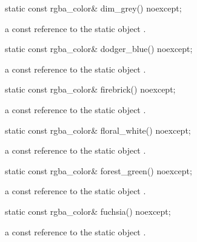 \begin{itemdecl}
static const rgba_color& dim_grey() noexcept;
\end{itemdecl}
\begin{itemdescr}
\pnum
\returns
a const reference to the static  object .
\end{itemdescr}

\begin{itemdecl}
static const rgba_color& dodger_blue() noexcept;
\end{itemdecl}
\begin{itemdescr}
\pnum
\returns
a const reference to the static  object .
\end{itemdescr}

\begin{itemdecl}
static const rgba_color& firebrick() noexcept;
\end{itemdecl}
\begin{itemdescr}
\pnum
\returns
a const reference to the static  object .
\end{itemdescr}

\begin{itemdecl}
static const rgba_color& floral_white() noexcept;
\end{itemdecl}
\begin{itemdescr}
\pnum
\returns
a const reference to the static  object .
\end{itemdescr}

\begin{itemdecl}
static const rgba_color& forest_green() noexcept;
\end{itemdecl}
\begin{itemdescr}
\pnum
\returns
a const reference to the static  object .
\end{itemdescr}

\begin{itemdecl}
static const rgba_color& fuchsia() noexcept;
\end{itemdecl}
\begin{itemdescr}
\pnum
\returns
a const reference to the static  object .
\end{itemdescr}

